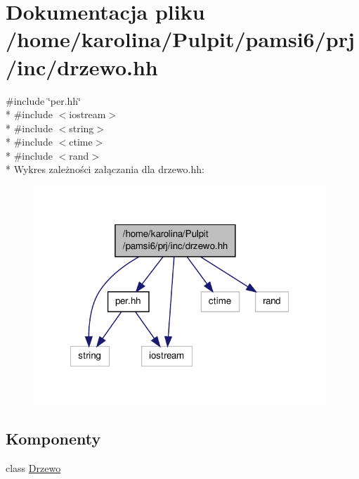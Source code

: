 \hypertarget{drzewo_8hh}{\section{Dokumentacja pliku /home/karolina/\-Pulpit/pamsi6/prj/inc/drzewo.hh}
\label{drzewo_8hh}
}
{\ttfamily \#include \char`\"{}per.\-hh\char`\"{}}\\*
{\ttfamily \#include $<$iostream$>$}\\*
{\ttfamily \#include $<$string$>$}\\*
{\ttfamily \#include $<$ctime$>$}\\*
{\ttfamily \#include $<$rand$>$}\\*
Wykres zależności załączania dla drzewo.\-hh\-:
\nopagebreak
\begin{figure}[H]
\begin{center}
\leavevmode
\includegraphics[width=311pt]{drzewo_8hh__incl}
\end{center}
\end{figure}
\subsection*{Komponenty}
\begin{DoxyCompactItemize}
\item 
class \hyperlink{class_drzewo}{Drzewo}
\end{DoxyCompactItemize}
